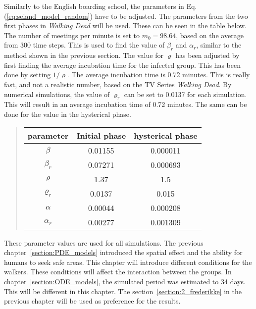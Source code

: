 \documentclass[%
twoside,                 %
final,                   %
chapterprefix=true,      %
open=right               %
10pt]{book}
\begin{document}
Similarly to the English boarding school, the parameters in Eq.(\ref{eq:seland_model_random}) have to be adjusted. The parameters from the two first phases in \emph{Walking Dead} will be used. These can be seen in the table below. The number of meetings per minute is set to $m_0 = 98.64$, based on the average from 300 time steps. This is used to find the value of $\beta_r$ and $\alpha_r$, similar to the method shown in the previous section. The value for $\varrho$ has been adjusted by first finding the average incubation time for the infected group. This has been done by setting $1/\varrho$. The average incubation time is 0.72 minutes. This is really fast, and not a realistic number, based on the TV Series \emph{Walking Dead}. By numerical simulations, the value of $\varrho_r$ can be set to 0.0137 for each simulation. This will result in an average incubation time of 0.72 minutes. The same can be done for the value in the hysterical phase.  

\label{table:param_val_random}

\begin{quote}
\begin{tabular}{ccc}
\hline
\multicolumn{1}{c}{ parameter } & \multicolumn{1}{c}{ Initial phase } & \multicolumn{1}{c}{ hysterical phase } \\
\hline
$\beta$     & 0.01155       & 0.000011         \\
$\beta_r$   & 0.07271       & 0.000693         \\
$\varrho$   & 1.37          & 1.5              \\
$\varrho_r$ & 0.0137        & 0.015            \\
$\alpha$    & 0.00044       & 0.000208         \\
$\alpha_r$  & 0.00277       & 0.001309         \\
\hline
\end{tabular}
\end{quote}

\noindent
These parameter values are used for all simulations. The previous chapter~\ref{section:PDE_models} introduced the spatial effect and the ability for humans to seek safe areas. This chapter will introduce different conditions for the walkers. These conditions will affect the interaction between the groups. In chapter~\ref{section:ODE_models}, the simulated period was estimated to 34 days. This will be different in this chapter. The section~\ref{section:2_frederikke} in the previous chapter will be used as preference for the results. 
\end{document}
